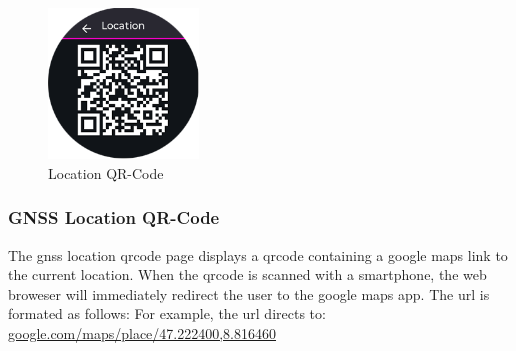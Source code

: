 \begin{minipage}{\linewidth}
	\begin{figure}
		\vspace{-0.6cm}
		\includegraphics[width=4cm]{images/6_design_final/gui/07_gnss_location.png}
		\centering
		\caption{Location QR-Code}
		\label{fig:final_design_gui_gnss_location}
	\end{figure}
	\subsubsection{GNSS Location QR-Code}
	The \acrshort{gnss} location \acrshort{qrcode} page displays a \acrshort{qrcode} containing a google maps link to the current location.
	When the \acrshort{qrcode} is scanned with a smartphone, the web broweser will immediately redirect the user to the google maps app.
	The \acrshort{url} is formated as follows: \smallskip \newline
	 \smallskip \newline
	For example, the \acrshort{url} directs to: \smallskip \newline
	\url{google.com/maps/place/47.222400,8.816460}
\end{minipage}
\vspace{0.0cm}

